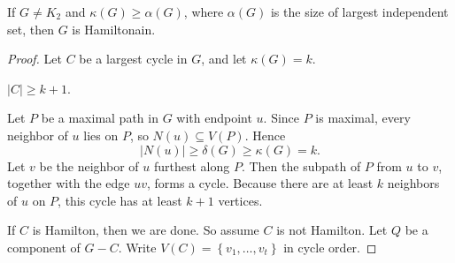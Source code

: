 \begin{theorem}
    If \(G \neq K_2\) and \(\kappa (G) \ge \alpha (G)\), where \(\alpha (G)\) is the size of largest independent set, then \(G\) is Hamiltonain.
\end{theorem}

\begin{proof}
    Let \(C\) be a largest cycle in \(G\), and let \(\kappa (G) = k\).

    \begin{claim}
        \(\vert C \vert \ge k + 1\).
    \end{claim}

    \begin{explanation}
        Let \(P\) be a maximal path in \(G\) with endpoint \(u\). Since \(P\) is maximal, every neighbor of \(u\) lies on \(P\), so \(N(u) \subseteq V(P)\). Hence
        \[
            \vert N(u) \vert \ge \delta (G) \ge \kappa (G) = k.
        \]
        Let \(v\) be the neighbor of \(u\) furthest along \(P\). Then the subpath of \(P\) from \(u\) to \(v\), together with the edge \(uv\), forms a cycle. Because there are at least \(k\) neighbors of \(u\) on \(P\), this cycle has at least \(k + 1\) vertices.

        \begin{center}
        \end{center}
    \end{explanation}

    If \(C\) is Hamilton, then we are done. So assume \(C\) is not Hamilton. Let \(Q\) be a component of \(G - C\). Write \(V(C) = \left\{ v_1, \dots , v_t \right\}\) in cycle order.


\end{proof}
